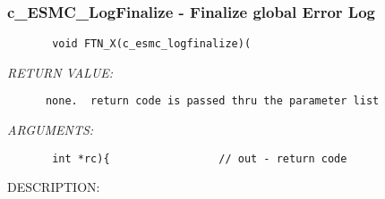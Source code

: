  
\setlength{\oldparskip}{\parskip}
\setlength{\parskip}{1.5ex}
\setlength{\oldparindent}{\parindent}
\setlength{\parindent}{0pt}
\setlength{\oldbaselineskip}{\baselineskip}
\setlength{\baselineskip}{11pt}
 
\def\bv{\begin{verbatim}}
\def\ev{\end{verbatim}}
\def\be{\begin{equation}}
\def\ee{\end{equation}}
\def\bea{\begin{eqnarray}}
\def\eea{\end{eqnarray}}
\def\bi{\begin{itemize}}
\def\ei{\end{itemize}}
\def\bn{\begin{enumerate}}
\def\en{\end{enumerate}}
\def\bd{\begin{description}}
\def\ed{\end{description}}
\def\({\left (}
\def\){\right )}
\def\[{\left [}
\def\]{\right ]}
\def\<{\left  \langle}
\def\>{\right \rangle}
\def\cI{{\cal I}}
\def\diag{\mathop{\rm diag}}
\def\tr{\mathop{\rm tr}}


 
\subsubsection [c\_ESMC\_LogFinalize] {c\_ESMC\_LogFinalize - Finalize global Error Log}


  
\begin{verbatim}       void FTN_X(c_esmc_logfinalize)(\end{verbatim}{\em RETURN VALUE:}
\begin{verbatim}      none.  return code is passed thru the parameter list\end{verbatim}{\em ARGUMENTS:}
\begin{verbatim}       int *rc){                 // out - return code\end{verbatim}
{\sf DESCRIPTION:\\ }


